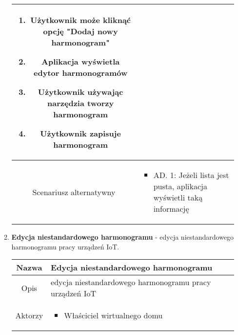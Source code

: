 \documentclass{article}
\begin{document}
\begin{enumerate}
\begin{enumerate}
\begin{table}[H]
\begin{tabular}{|c|p{7cm}|}
\begin{enumerate}
\item Użytkownik może kliknąć opcję "Dodaj nowy harmonogram"

\item Aplikacja wyświetla edytor harmonogramów

\item Użytkownik używając narzędzia tworzy harmonogram

\item Użytkownik zapisuje harmonogram\end{enumerate} \\
						\hline
						Scenariusz alternatywny & \begin{itemize}\item AD. 1: Jeżeli lista jest pusta, aplikacja wyświetli taką informację\end{itemize}                                                                                                                                                                                                                                                \\
						\hline
					\end{tabular}
				\end{table}

			\item \textbf{Edycja niestandardowego harmonogramu} - edycja
				niestandardowego harmonogramu pracy urządzeń IoT.

				\begin{table}[H]
					\centering
					\begin{tabular}{|c|p{7cm}|}
						\hline
						Nazwa                   & Edycja niestandardowego harmonogramu                                                                                                                                                                                                                                                                                                                              \\
						\hline
						Opis                    & edycja niestandardowego harmonogramu pracy urządzeń IoT                                                                                                                                                                                                                                                                                                           \\
						\hline
						Aktorzy                 & \begin{itemize}\item Właściciel wirtualnego domu


\end{itemize}
\end{tabular}
\end{table}
\end{enumerate}
\end{enumerate}
\end{document}
